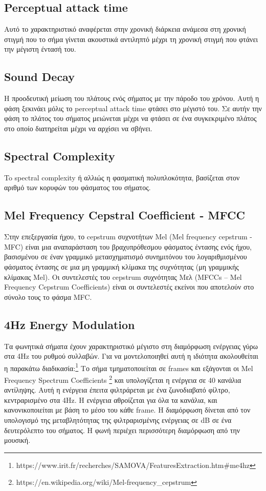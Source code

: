 \subsection{Perceptual attack time}

Αυτό το χαρακτηριστικό αναφέρεται στην χρονική διάρκεια ανάμεσα στη χρονική στιγμή που το σήμα γίνεται ακουστικά αντιληπτό μέχρι τη χρονική στιγμή που φτάνει την μέγιστη έντασή του. 

\subsection{Sound Decay}

Η προοδευτική μείωση του πλάτους ενός σήματος με την πάροδο του χρόνου. Αυτή η φάση ξεκινάει μόλις το perceptual attack time φτάσει στο μέγιστό του. Σε αυτήν την φάση το πλάτος του σήματος μειώνεται μέχρι να φτάσει σε ένα συγκεκριμένο πλάτος στο οποίο διατηρείται μέχρι να αρχίσει να σβήνει.


\subsection{Spectral Complexity}
 
 To spectral complexity ή αλλιώς η φασματική πολυπλοκότητα, βασίζεται στον αριθμό των κορυφών του φάσματος του σήματος.

\subsection{Mel Frequency Cepstral Coefficient - MFCC }

Στην επεξεργασία ήχου, το cepstrum συχνοτήτων Mel (Μel frequency cepstrum - MFC)
είναι μια αναπαράσταση του βραχυπρόθεσμου φάσματος έντασης ενός ήχου, βασισμένου σε έναν γραμμικό μετασχηματισμό συνημιτόνου του λογαριθμισμένου φάσματος έντασης σε μια μη γραμμική κλίμακα της συχνότητας (μη γραμμικής κλίμακας Mel).  Οι συντελεστές του cepstrum συχνότητας Μελ (MFCCs – Mel Frequency Cepstrum Coefficients) είναι οι συντελεστές εκείνοι που αποτελούν στο σύνολο τους το φάσμα MFC.


\subsection{4Hz Energy Modulation}

Τα φωνητικά σήματα έχουν χαρακτηριστικό μέγιστο στη διαμόρφωση ενέργειας γύρω στα 4Hz του ρυθμού συλλαβών. Για να μοντελοποιηθεί αυτή η ιδιότητα ακολουθείται η παρακάτω διαδικασία:\footnote{https://www.irit.fr/recherches/SAMOVA/FeaturesExtraction.htm\#me4hz} Το σήμα τμηματοποιείται σε frames και εξάγονται οι Mel Frequency Spectrum Coefficients \footnote{https://en.wikipedia.org/wiki/Mel-frequency\_cepstrum} και υπολογίζεται η ενέργεια σε 40 κανάλια αντίληψης. Αυτή η ενέργεια έπειτα φιλτράρεται με ένα ζωνοδιαβατό φίλτρο, κεντραρισμένο στα 4Hz. Η ενέργεια αθροίζεται για όλα τα κανάλια, και κανονικοποιείται με βάση το μέσο του κάθε frame. Η διαμόρφωση δίνεται από τον υπολογισμό της μεταβλητότητας της φιλτραρισμένης ενέργειας σε dB σε ένα δευτερόλεπτο του σήματος. Η φωνή περιέχει περισσότερη διαμόρφωση από την μουσική.


